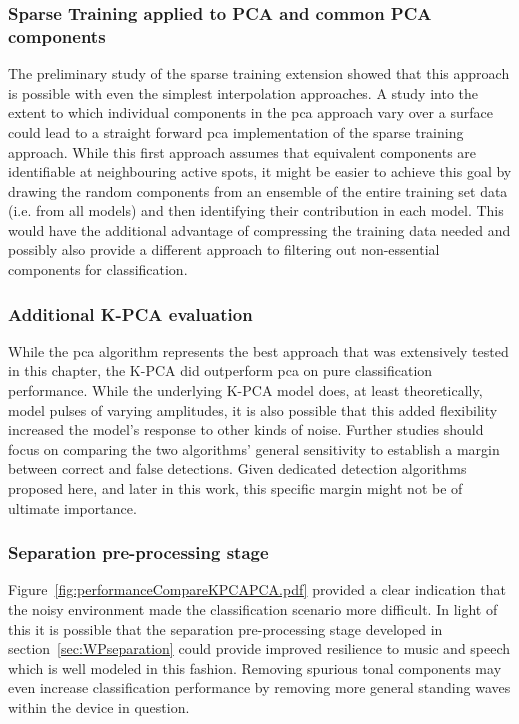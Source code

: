 \subsubsection{Sparse Training applied to PCA and common PCA components}
The preliminary study of the sparse training extension showed that this approach is possible with even the simplest interpolation approaches. A study into the extent to which individual components in the \gls{pca} approach vary over a surface could lead to a straight forward \gls{pca} implementation of the sparse training approach. While this first approach assumes that equivalent components are identifiable at neighbouring active spots, it might be easier to achieve this goal by drawing the random components from an ensemble of the entire training set data (i.e. from all models) and then identifying their contribution in each model. This would have the additional advantage of compressing the training data needed and possibly also provide a different approach to filtering out non-essential components for classification.

\subsubsection{Additional K-PCA evaluation}
While the \gls{pca} algorithm represents the best approach that was extensively tested in this chapter, the K-PCA did outperform \gls{pca} on pure classification performance. While the underlying K-PCA model does, at least theoretically, model pulses of varying amplitudes, it is also possible that this added flexibility increased the model's response to other kinds of noise. Further studies should focus on comparing the two algorithms' general sensitivity to establish a margin between correct and false detections. Given dedicated detection algorithms proposed here, and later in this work, this specific margin might not be of ultimate importance.

\subsubsection{Separation pre-processing stage}
Figure~\ref{fig:performanceCompareKPCAPCA.pdf} provided a clear indication that the noisy environment made the classification scenario more difficult. In light of this it is possible that the separation pre-processing stage developed in section~\ref{sec:WPseparation} could provide improved resilience to music and speech which is well modeled in this fashion. Removing spurious tonal components may even increase classification performance by removing more general standing waves within the device in question.


